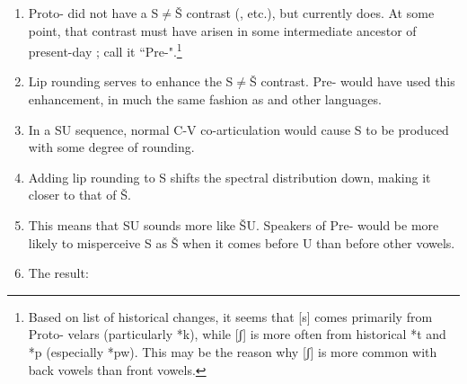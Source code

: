 \documentclass[output=paper,newtxmath,modfonts,nonflat]{langsci/langscibook}
\begin{document}
\begin{enumerate}
\item 
Proto- did not have a S${\neq}$Š contrast (\citealt{Meinhof1932,Hyman:2003a}, etc.), but  currently does. At some point, that contrast must have arisen in some intermediate ancestor of present-day ; call it ``Pre-".\footnote{Based on  list of historical changes, it seems that [s] comes primarily from Proto- velars (particularly *k), while [ʃ] is more often from historical *t and *p (especially *pw). This may be the reason why [ʃ] is more common with back vowels than front vowels.}

\item Lip rounding serves to enhance the S${\neq}$Š contrast. Pre- would have used this enhancement, in much the same fashion as  and other languages.

\item In a SU sequence, normal C-V co-articulation would cause S to be produced with some degree of rounding.

\item Adding lip rounding to S shifts the spectral distribution down, making it closer to that of Š.

\item This means that SU sounds more like ŠU. Speakers of Pre- would be more likely to misperceive S as Š when it comes before U than before other vowels.

\item The result: 


\end{enumerate}
\end{document}
